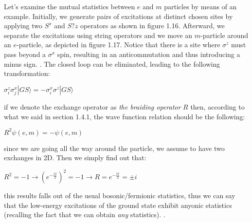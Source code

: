 \documentclass{Configuration_Files/PoliMi3i_thesis}
\begin{document}
Let's examine the mutual statistics between $e$ and $m$ particles by means of an example. Initially, we generate pairs of excitations at distinct chosen sites by applying two $S^x$ and $S?z$ operators as shown in figure 1.16. Afterward, we separate the excitations using string operators and we move an $m$-particle around an $e$-particle, as depicted in figure 1.17. Notice that there is a site where $\sigma^z$ must pass beyond a $\sigma^x$ spin, resulting in an anticommutation and thus introducing a minus sign. {\cite{Kit02}}.
The closed loop can be eliminated, leading to the following transformation:

\begin{center}
	$\sigma_i^z\sigma_j^x|GS\rangle = - \sigma_i^x\sigma^z|GS\rangle$
\end{center}

if we denote the exchange operator as {\it the braiding operator} $R$ then, according to what we said in section 1.4.1, the wave function relation should be the following:

\begin{center}
	$R^2\psi(e,m) = - \psi(e,m)$
\end{center}

since we are going all the way around the particle, we assume to have two exchanges in 2D. Then we simply find out that:

\begin{center}
	$R^2 = - 1 \rightarrow ( e^{-\frac{i\pi}{2}})^2 = - 1  \rightarrow R = e^{-\frac{i\pi}{2}} = \pm i $
\end{center}

this results falls out of the usual bosonic/fermionic statistics, thus we can say that the low-energy excitations of the ground state exhibit anyonic statistics (recalling the fact that we can obtain \textit{any} statistics). {\cite{Rao16, Kit02, Pre04}}.\newline
\end{document}

